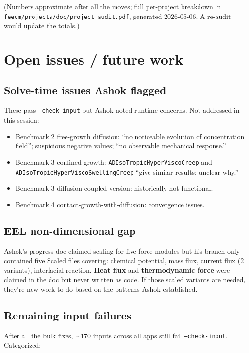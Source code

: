 \documentclass[11pt,letterpaper]{article}
\newenvironment{tightitemize}{\begin{itemize}\setlength\itemsep{0pt}\setlength\parsep{0pt}}{\end{itemize}}
\newcommand{\code}[1]{\texttt{\small #1}}
\begin{document}
(Numbers approximate after all the moves; full per-project breakdown
in \code{feecm/projects/doc/project\_audit.pdf}, generated 2026-05-06.
A re-audit would update the totals.)

\section{Open issues / future work}

\subsection{Solve-time issues Ashok flagged}

These pass \code{--check-input} but Ashok noted runtime concerns. Not
addressed in this session:

\begin{tightitemize}
  \item Benchmark 2 free-growth diffusion: ``no noticeable evolution of concentration field'';
    suspicious negative values; ``no observable mechanical response.''
  \item Benchmark 3 confined growth: \code{ADIsoTropicHyperViscoCreep} and
    \code{ADIsoTropicHyperViscoSwellingCreep} ``give similar results; unclear why.''
  \item Benchmark 3 diffusion-coupled version: historically not functional.
  \item Benchmark 4 contact-growth-with-diffusion: convergence issues.
\end{tightitemize}

\subsection{EEL non-dimensional gap}

Ashok's progress doc claimed scaling for five force modules but his branch only
contained five Scaled files covering: chemical potential, mass flux, current flux
(2 variants), interfacial reaction. \textbf{Heat flux} and \textbf{thermodynamic
force} were claimed in the doc but never written as code. If those scaled variants
are needed, they're new work to do based on the patterns Ashok established.

\subsection{Remaining input failures}

After all the bulk fixes, ${\sim}170$ inputs across all apps still fail
\code{--check-input}. Categorized:
\end{document}

